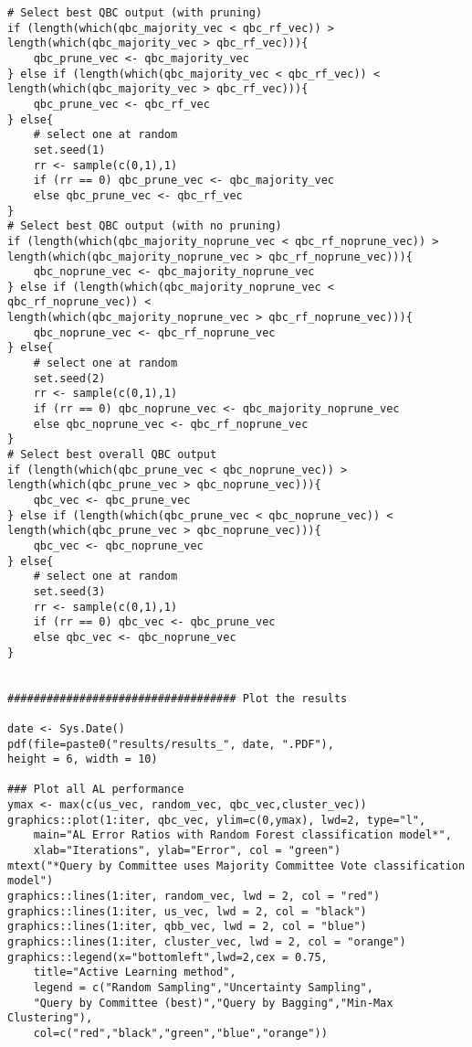 {\begin{lstlisting}
# Select best QBC output (with pruning)
if (length(which(qbc_majority_vec < qbc_rf_vec)) > 
length(which(qbc_majority_vec > qbc_rf_vec))){
	qbc_prune_vec <- qbc_majority_vec
} else if (length(which(qbc_majority_vec < qbc_rf_vec)) < 
length(which(qbc_majority_vec > qbc_rf_vec))){
	qbc_prune_vec <- qbc_rf_vec
} else{
	# select one at random
	set.seed(1)
	rr <- sample(c(0,1),1)
	if (rr == 0) qbc_prune_vec <- qbc_majority_vec
	else qbc_prune_vec <- qbc_rf_vec
}
# Select best QBC output (with no pruning)
if (length(which(qbc_majority_noprune_vec < qbc_rf_noprune_vec)) > 
length(which(qbc_majority_noprune_vec > qbc_rf_noprune_vec))){
	qbc_noprune_vec <- qbc_majority_noprune_vec
} else if (length(which(qbc_majority_noprune_vec < qbc_rf_noprune_vec)) < 
length(which(qbc_majority_noprune_vec > qbc_rf_noprune_vec))){
	qbc_noprune_vec <- qbc_rf_noprune_vec
} else{
	# select one at random
	set.seed(2)
	rr <- sample(c(0,1),1)
	if (rr == 0) qbc_noprune_vec <- qbc_majority_noprune_vec
	else qbc_noprune_vec <- qbc_rf_noprune_vec
}
# Select best overall QBC output
if (length(which(qbc_prune_vec < qbc_noprune_vec)) > 
length(which(qbc_prune_vec > qbc_noprune_vec))){
	qbc_vec <- qbc_prune_vec
} else if (length(which(qbc_prune_vec < qbc_noprune_vec)) < 
length(which(qbc_prune_vec > qbc_noprune_vec))){
	qbc_vec <- qbc_noprune_vec
} else{
	# select one at random
	set.seed(3)
	rr <- sample(c(0,1),1)
	if (rr == 0) qbc_vec <- qbc_prune_vec
	else qbc_vec <- qbc_noprune_vec
}


################################### Plot the results

date <- Sys.Date()
pdf(file=paste0("results/results_", date, ".PDF"), 
height = 6, width = 10)

### Plot all AL performance
ymax <- max(c(us_vec, random_vec, qbc_vec,cluster_vec))
graphics::plot(1:iter, qbc_vec, ylim=c(0,ymax), lwd=2, type="l", 
	main="AL Error Ratios with Random Forest classification model*", 
	xlab="Iterations", ylab="Error", col = "green")
mtext("*Query by Committee uses Majority Committee Vote classification model")
graphics::lines(1:iter, random_vec, lwd = 2, col = "red")
graphics::lines(1:iter, us_vec, lwd = 2, col = "black")
graphics::lines(1:iter, qbb_vec, lwd = 2, col = "blue")
graphics::lines(1:iter, cluster_vec, lwd = 2, col = "orange")
graphics::legend(x="bottomleft",lwd=2,cex = 0.75,
	title="Active Learning method",
	legend = c("Random Sampling","Uncertainty Sampling",
	"Query by Committee (best)","Query by Bagging","Min-Max Clustering"),
	col=c("red","black","green","blue","orange"))


\end{lstlisting}}
